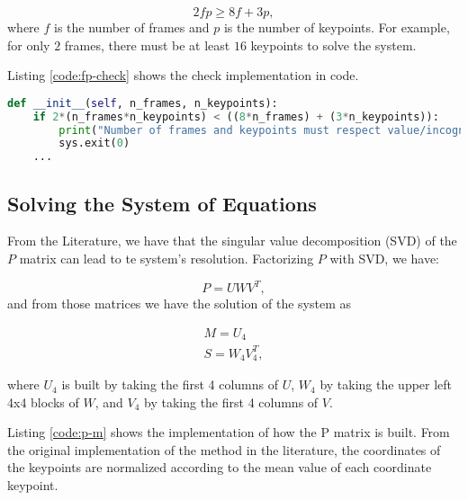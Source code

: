 \documentclass[]{IEEEtran}
\begin{document}
\begin{equation}
    2fp \geq 8f + 3p,
\end{equation}
where $f$ is the number of frames and $p$ is the number of keypoints. For example, for only $2$ frames, there must be at least $16$ keypoints to solve the system.
\par Listing \ref{code:fp-check} shows the check implementation in code. 
\begin{lstlisting}[language=Python, caption={SfM Parameter Check in initialization.}, label={code:fp-check}]
def __init__(self, n_frames, n_keypoints):
    if 2*(n_frames*n_keypoints) < ((8*n_frames) + (3*n_keypoints)):
        print("Number of frames and keypoints must respect value/incognito ratio constraint")
        sys.exit(0)
    ...
\end{lstlisting}


\subsection{Solving the System of Equations}
From the Literature, we have that the singular value decomposition (SVD) of the $P$ matrix can lead to te system's resolution. Factorizing $P$ with SVD, we have:

\begin{equation}
P = UWV^{T},
\end{equation}
and from those matrices we have the solution of the system as

\begin{equation}
\begin{split}
    M = U_{4} \\ S = W_{4}V_{4}^{T},
\end{split} \end{equation}

where $U_{4}$ is built by taking the first 4 columns of $U$, $W_{4}$
by taking the upper left 4x4 blocks of $W$, and $V_{4}$ by taking the first 4 columns of $V$.

\par Listing \ref{code:p-m} shows the implementation of how the P matrix is built. From the original implementation of the method in the literature\cite{SFM}, the coordinates of the keypoints are normalized according to the mean value of each coordinate keypoint.
\end{document}
